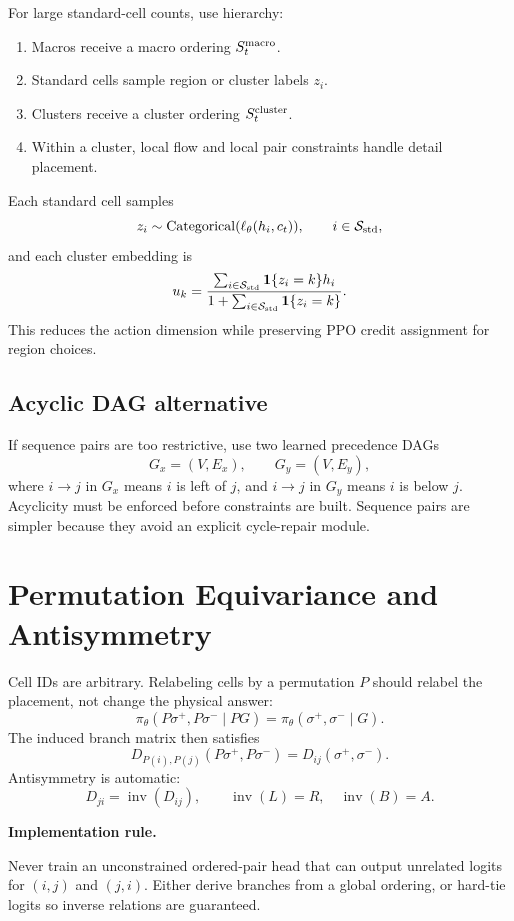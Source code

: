 \documentclass[11pt]{article}
\newcommand{\one}{\mathbf{1}}
\newcommand{\Cat}{\operatorname{Categorical}}
\newcommand{\Std}{\mathcal{S}_{\rm std}}
\newcommand{\seqp}{\sigma^+}
\newcommand{\seqm}{\sigma^-}
\newcommand{\callout}[3]{%
\medskip\noindent\textbf{\textcolor{#1}{#2.}}\par\noindent #3\par\medskip
}
\begin{document}
For large standard-cell counts, use hierarchy:
\begin{enumerate}
    \item Macros receive a macro ordering $S_t^{\rm macro}$.
    \item Standard cells sample region or cluster labels $z_i$.
    \item Clusters receive a cluster ordering $S_t^{\rm cluster}$.
    \item Within a cluster, local flow and local pair constraints handle detail placement.
\end{enumerate}

Each standard cell samples
\[
    z_i\sim\Cat(\ell_\theta(h_i,c_t)),\qquad i\in\Std,
\]
and each cluster embedding is
\[
    u_k=\frac{\sum_{i\in\Std}\one\{z_i=k\}h_i}{1+\sum_{i\in\Std}\one\{z_i=k\}}.
\]
This reduces the action dimension while preserving PPO credit assignment for region choices.

\subsection{Acyclic DAG alternative}

If sequence pairs are too restrictive, use two learned precedence DAGs
\[
    G_x=(V,E_x),\qquad G_y=(V,E_y),
\]
where $i\rightarrow j$ in $G_x$ means $i$ is left of $j$, and $i\rightarrow j$ in $G_y$ means $i$ is below $j$. Acyclicity must be enforced before constraints are built. Sequence pairs are simpler because they avoid an explicit cycle-repair module.

\section{Permutation Equivariance and Antisymmetry}

Cell IDs are arbitrary. Relabeling cells by a permutation $P$ should relabel the placement, not change the physical answer:
\[
    \pi_\theta(P\seqp,P\seqm\mid PG)
    =\pi_\theta(\seqp,\seqm\mid G).
\]
The induced branch matrix then satisfies
\[
    D_{P(i),P(j)}(P\seqp,P\seqm)=D_{ij}(\seqp,\seqm).
\]
Antisymmetry is automatic:
\[
    D_{ji}=\operatorname{inv}(D_{ij}),
    \qquad
    \operatorname{inv}(L)=R,
    \quad
    \operatorname{inv}(B)=A.
\]

\callout{purple!70!black}{Implementation rule}{Never train an unconstrained ordered-pair head that can output unrelated logits for $(i,j)$ and $(j,i)$. Either derive branches from a global ordering, or hard-tie logits so inverse relations are guaranteed.}
\end{document}
